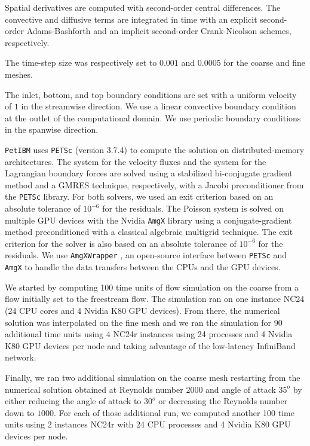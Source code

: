 \documentclass[12pt]{article}
\newcommand{\petibm}{\texttt{PetIBM} }
\newcommand{\petsc}{\texttt{PETSc} }
\newcommand{\amgx}{\texttt{AmgX} }
\newcommand{\amgxwrapper}{\texttt{AmgXWrapper} }
\begin{document}
Spatial derivatives are computed with second-order central differences.
The convective and diffusive terms are integrated in time with an explicit second-order Adams-Bashforth and an implicit second-order Crank-Nicolson schemes, respectively.

The time-step size was respectively set to $0.001$ and $0.0005$ for the coarse and fine meshes.

The inlet, bottom, and top boundary conditions are set with a uniform velocity of $1$ in the streamwise direction.
We use a linear convective boundary condition at the outlet of the computational domain.
We use periodic boundary conditions in the spanwise direction.

\petibm uses \petsc (version 3.7.4) to compute the solution on distributed-memory architectures.
The system for the velocity fluxes and the system for the Lagrangian boundary forces are solved using a stabilized bi-conjugate gradient method and a GMRES technique, respectively, with a Jacobi preconditioner from the \petsc library.
For both solvers, we used an exit criterion based on an absolute tolerance of $10^{-6}$ for the residuals.
The Poisson system is solved on multiple GPU devices with the Nvidia \amgx library using a conjugate-gradient method preconditioned with a classical algebraic multigrid technique.
The exit criterion for the solver is also based on an absolute tolerance of $10^{-6}$ for the residuals.
We use \amgxwrapper, an open-source interface between \petsc and \amgx to handle the data transfers between the CPUs and the GPU devices.

We started by computing 100 time units of flow simulation on the coarse from a flow initially set to the freestream flow.
The simulation ran on one instance NC24 (24 CPU cores and 4 Nvidia K80 GPU devices).
From there, the numerical solution was interpolated on the fine mesh and we ran the simulation for 90 additional time units using 4 NC24r instances using 24 processes and 4 Nvidia K80 GPU devices per node and taking advantage of the low-latency InfiniBand network.

Finally, we ran two additional simulation on the coarse mesh restarting from the numerical solution obtained at Reynolds number $2000$ and angle of attack $35^o$ by either reducing the angle of attack to $30^o$ or decreasing the Reynolds number down to $1000$.
For each of those additional run, we computed another 100 time units using 2 instances NC24r with 24 CPU processes and 4 Nvidia K80 GPU devices per node.
\end{document}
